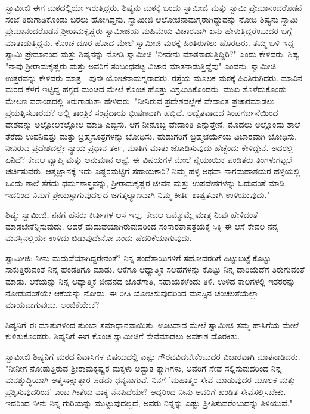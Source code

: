 ಸ್ವಾಮೀಜಿ ಈಗ ಮಠದಲ್ಲಿಯೇ ಇರುತ್ತಿದ್ದರು. ಶಿಷ್ಯನು ಮಠಕ್ಕೆ ಬಂದು ಸ್ವಾಮೀಜಿ ಮತ್ತು ಸ್ವಾಮಿ ಪ್ರೇಮಾನಂದರೊಡನೆ ಸಂಜೆ ತಿರುಗಾಡಿಕೊಂಡು ಬರಲು ಹೋಗಿದ್ದನು. ಸ್ವಾಮೀಜಿ ಆಲೋಚನಾಮಗ್ನರಾಗಿದ್ದುದನ್ನು ನೋಡಿ ಶಿಷ್ಯನು ಸ್ವಾಮಿ ಪ್ರೇಮಾನಂದರೊಡನೆ ಶ‍್ರೀರಾಮಕೃಷ್ಣರು ಸ್ವಾಮೀಜಿಯ ಮಹಿಮೆಯ ವಿಚಾರವಾಗಿ ಏನು ಹೇಳುತ್ತಿದ್ದರೆಂಬುದರ ಬಗ್ಗೆ ಮಾತಾಡುತ್ತಿದ್ದನು. ಕೊಂಚ ದೂರ ಹೋದ ಮೇಲೆ ಸ್ವಾಮೀಜಿ ಮಠಕ್ಕೆ ಹಿಂತಿರುಗಲು ಹೊರಟರು. ತಮ್ಮ ಬಳಿ ಇದ್ದ ಸ್ವಾಮಿ ಪ್ರೇಮಾನಂದ ಮತ್ತು ಶಿಷ್ಯನನ್ನು ನೋಡಿ ಸ್ವಾಮೀಜಿ "ನೀವೇನು ಮಾತನಾಡುತ್ತಿದ್ದಿರಿ?" ಎಂದು ಕೇಳಿದರು. ಶಿಷ್ಯ "ನಾವು ಶ‍್ರೀರಾಮಕೃಷ್ಣರು ಮತ್ತು ಅವರಿಗೆ ಸಂಬಂಧಪಟ್ಟ ವಿಚಾರ ಮಾತನಾಡುತ್ತಿದ್ದೆವು" ಎಂದನು. ಸ್ವಾಮೀಜಿ ಉತ್ತರವನ್ನು ಕೇಳಿದರು ಮಾತ್ರ - ಪುನಃ ಯೋಚನಾಮಗ್ನರಾದರು. ರಸ್ತೆಯ ಮೂಲಕ ಮಠಕ್ಕೆ ಹಿಂತಿರುಗಿದರು. ಮಾವಿನ ಮರದ ಕೆಳಗೆ ಇಟ್ಟಿದ್ದ ಹಗ್ಗದ ಮಂಚದ ಮೇಲೆ ಕೊಂಚ ಹೊತ್ತು ವಿಶ್ರಮಿಸಿಕೊಂಡರು. ಮುಖ ತೊಳೆದುಕೊಂಡು ಮೇಲಣ ವರಾಂಡದಲ್ಲಿ ತಿರುಗಾಡುತ್ತಾ ಹೇಳಿದರು: "ನೀನಿರುವ ಪ್ರದೇಶದಲ್ಲೇಕೆ ವೇದಾಂತ ಪ್ರಚಾರಮಾಡಲು ಪ್ರಯತ್ನಿಸಬಾರದು? ಅಲ್ಲಿ ತಾಂತ್ರಿಕ ಸಂಪ್ರದಾಯ ಭೀಷಣವಾಗಿ ಹಬ್ಬಿದೆ. ಅದ್ವೈತವಾದದ ಸಿಂಹಗರ್ಜನೆಯಿಂದ ದೇಶವನ್ನು ಅಲ್ಲೋಲಕಲ್ಲೋಲ ಮಾಡಿ ಎಬ್ಬಿಸು. ಆಗ ನೀನೊಬ್ಬ ವೇದಾಂತಿ ಎನ್ನುತ್ತೇನೆ. ಮೊದಲು ಅಲ್ಲೊಂದು ಶಾಲೆ ತೆರೆದು ಉಪನಿಷತ್ತು ಮತ್ತು ಬ್ರಹ್ಮಸೂತ್ರಗಳನ್ನು ಬೋಧಿಸು. ಹುಡುಗರಿಗೆ ಬ್ರಹ್ಮಚರ್ಯೆಯ ವಿಚಾರವಾಗಿ ಬೋಧಿಸು. ನೀನಿರುವ ಪ್ರದೇಶದಲ್ಲೇ ನ್ಯಾಯ ಪ್ರಧಾನ ತರ್ಕ, ಮಾತಿಗೆ ಮಾತು ಜೋಡಿಸುವುದು ಹೆಚ್ಚೆಂದು ಕೇಳಿದ್ದೇನೆ. ಅದರಲ್ಲಿ ಏನಿದೆ? ಕೇವಲ ವ್ಯಾಪ್ತಿ ಮತ್ತು ಅನುಮಾನ ಅಷ್ಟೆ. ಈ ವಿಷಯಗಳ ಮೇಲೆ ನೈಯಾಯಿಕ ಪಂಡಿತರು ತಿಂಗಳುಗಟ್ಟಲೆ ಚರ್ಚಿಸುವರು. ಆತ್ಮಜ್ಞಾನಕ್ಕೆ ಇದು ಎಷ್ಟರಮಟ್ಟಿಗೆ ಸಹಾಯಕಾರಿ? ನಿಮ್ಮ ಹಳ್ಳಿ ಅಥವಾ ನಾಗಮಹಾಶಯರ ಹಳ್ಳಿಯಲ್ಲಿ ಒಂದು ಶಾಲೆ ತೆಗೆದು ಧರ್ಮಶಾಸ್ತ್ರವನ್ನು, ಶ‍್ರೀರಾಮಕೃಷ್ಣರ ಜೀವನ ಮತ್ತು ಉಪದೇಶಗಳನ್ನು ಓದುವಂತೆ ಮಾಡಿ. ಇದರಿಂದ ನಿಮಗೆ ಶ್ರೇಯಸ್ಸಾಗುವುದಲ್ಲದೆ ಜಗತ್ಕಲ್ಯಾಣವಾಗಿ ನಿಮ್ಮ ಕೀರ್ತಿ ಶಾಶ್ವತವಾಗಿ ಉಳಿಯುವುದು."

ಶಿಷ್ಯ: ಸ್ವಾಮೀಜಿ, ನನಗೆ ಹೆಸರು ಕೀರ್ತಿಗಳ ಆಸೆ ಇಲ್ಲ. ಕೇವಲ ಒಮ್ಮೊಮ್ಮೆ ಮಾತ್ರ ನೀವು ಹೇಳಿದಂತೆ ಮಾಡಬೇಕೆನ್ನಿಸುವುದು. ಆದರೆ ಮದುವೆಯಾಗಿರುವುದರಿಂದ ಸಂಸಾರತಾಪತ್ರಯಕ್ಕೆ ಸಿಕ್ಕಿ ಈ ಆಸೆ ಕೇವಲ ನನ್ನ ಮನಸ್ಸಿನಲ್ಲಿಯೇ ಉಳಿದು ಬಿಡುವುದೇನೋ ಎಂದು ಹೆದರಿಕೆಯಾಗುವುದು.

ಸ್ವಾಮೀಜಿ: ನೀನು ಮದುವೆಯಾಗಿದ್ದರೇನಂತೆ? ನಿನ್ನ ತಂದೆತಾಯಿಗಳಿಗೆ ಸಹೋದರರಿಗೆ ಹಿಟ್ಟುಬಟ್ಟೆ ಕೊಟ್ಟು ಸಾಕುತ್ತಿರುವಂತೆ ನಿನ್ನ ಹೆಂಡತಿಗೂ ಮಾಡು. ಆಕೆಗೂ ಆಧ್ಯಾತ್ಮಿಕ ಸಲಹೆಗಳನ್ನು ಕೊಟ್ಟು ನಿನ್ನ ದಾರಿಯೆಡೆಗೆ ತಿರುಗುವಂತೆ ಮಾಡು. ಆಕೆಯನ್ನು ನಿನ್ನ ಆಧ್ಯಾತ್ಮಿಕ ಜೀವನದ ಜೊತೆಗಾತಿ, ಸಹಾಯಕಳೆಂದು ತಿಳಿ. ಉಳಿದ ಕಾಲಗಳಲ್ಲಿ ಇತರರನ್ನು ನೋಡುವಂತೆಯೇ ಆಕೆಯನ್ನು ನೋಡು. ಈ ರೀತಿ ಯೋಚಿಸುವುದರಿಂದ ಮನಸ್ಸಿನ ಚಂಚಲತೆಯೆಲ್ಲಾ ಮಾಯವಾಗುವುದು. ಅಂಜಿಕೆಯೇಕೆ?

ಶಿಷ್ಯನಿಗೆ ಈ ಮಾತುಗಳಿಂದ ತುಂಬಾ ಸಮಾಧಾನವಾಯಿತು. ಊಟವಾದ ಮೇಲೆ ಸ್ವಾಮೀಜಿ ತಮ್ಮ ಹಾಸಿಗೆಯ ಮೇಲೆ ಕುಳಿತುಕೊಂಡರು. ಶಿಷ್ಯನಿಗೆ ಈಗ ಕೊಂಚ ಸ್ವಾಮೀಜಿಗೆ ಸೇವೆಮಾಡಲು ಅವಕಾಶ ದೊರಕಿತು.

ಸ್ವಾಮೀಜಿ ಶಿಷ್ಯನಿಗೆ ಮಠದ ನಿವಾಸಿಗಳ ವಿಷಯದಲ್ಲಿ ಎಷ್ಟು ಗೌರವವಿಡಬೇಕೆಂಬುದರ ವಿಚಾರವಾಗಿ ಮಾತನಾಡಿದರು. "ನೀನೀಗ ನೋಡುತ್ತಿರುವ ಶ‍್ರೀರಾಮಕೃಷ್ಣರ ಮಕ್ಕಳು ಅದ್ಭುತ ತ್ಯಾಗಿಗಳು, ಅವರಿಗೆ ಸೇವೆ ಸಲ್ಲಿಸುವುದರಿಂದ ನಿನ್ನ ಮನಶ್ಶುದ್ಧಿಯಾಗಿ ಆತ್ಮಸಾಕ್ಷಾತ್ಕಾರ ಪಡೆದು ಧನ್ಯನಾಗುವೆ. ನಿನಗೆ 'ಮಹಾತ್ಮರ ಸೇವೆ ಮಾಡುವುದರ ಮೂಲಕ ಮತ್ತು ಪ್ರಶ್ನಿಸುವುದರಿಂದ' ಎಂಬ ಗೀತೆಯ ವಾಕ್ಯ ನೆನಪಿದೆಯೇ? ಆದ್ದರಿಂದ ನೀನು ಅವರಿಗೆ ಖಂಡಿತ ಸೇವೆಸಲ್ಲಿಸಬೇಕು. ಇದರಿಂದ ನೀನು ನಿನ್ನ ಗುರಿಯನ್ನು ಮುಟ್ಟುವುದಲ್ಲದೆ, ಅವರು ನಿನ್ನನ್ನು ಎಷ್ಟು ಪ್ರೀತಿಸುವರೆಂಬುದನ್ನು ತಿಳಿಯುವೆ."

